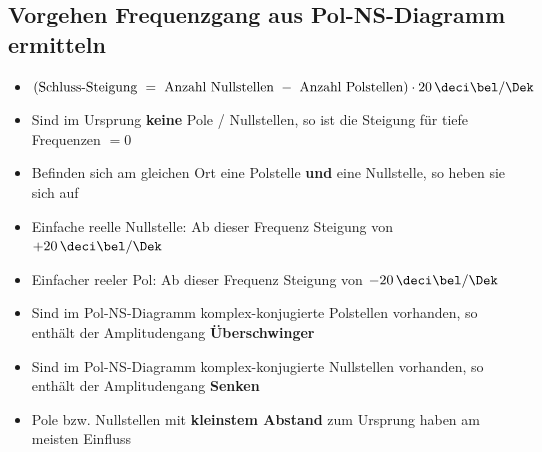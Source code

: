 

\subsection{Vorgehen Frequenzgang aus Pol-NS-Diagramm ermitteln}

\begin{itemize}
    \item $(\text{Schluss-Steigung } = \text{ Anzahl Nullstellen } - \text{ Anzahl Polstellen}) \cdot 20 \, \deci \bel / \Dek$
    \item Sind im Ursprung \textbf{keine} Pole / Nullstellen, so ist die Steigung für tiefe Frequenzen $= 0$
    \item Befinden sich am gleichen Ort eine Polstelle \textbf{und} eine Nullstelle, so heben sie sich auf
    \item Einfache reelle Nullstelle: Ab dieser Frequenz Steigung von  $+20 \, \deci \bel / \Dek$
    \item Einfacher reeler Pol: Ab dieser Frequenz Steigung von  $-20 \, \deci \bel / \Dek$
    \item Sind im Pol-NS-Diagramm komplex-konjugierte Polstellen vorhanden, so enthält der Amplitudengang \textbf{Überschwinger}
    \item Sind im Pol-NS-Diagramm komplex-konjugierte Nullstellen vorhanden, so enthält der Amplitudengang \textbf{Senken}
    \item Pole bzw. Nullstellen mit \textbf{kleinstem Abstand} zum Ursprung haben am meisten Einfluss
\end{itemize}


